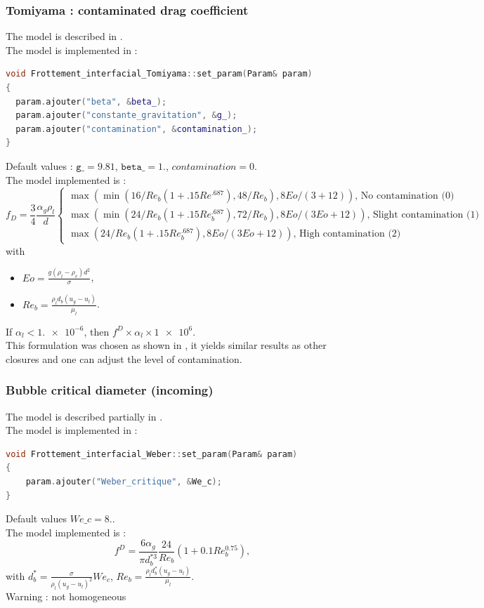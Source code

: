 \subsubsection{Tomiyama : contaminated drag coefficient}
The model is described in \cite{Tomiyama1998}.\\
The model is implemented in :
\begin{lstlisting}[language=c++]
void Frottement_interfacial_Tomiyama::set_param(Param& param)
{
  param.ajouter("beta", &beta_);
  param.ajouter("constante_gravitation", &g_);
  param.ajouter("contamination", &contamination_);
}
\end{lstlisting}
Default values : $\texttt{g\_}=9.81$, $\texttt{beta\_}=1.$, $contamination=0$.\\
The model implemented is :
\begin{equation}
f_D =\frac{3}{4}\frac{\alpha_g\rho_l}{d} \begin{cases} \max(\min(16/Re_b(1+.15Re^{.687}), 48/Re_b), 8Eo/(3+12)) \text{, No contamination (0)}\\
	\max(\min(24/Re_b(1+.15Re_b^{.687}), 72/Re_b), 8Eo/(3Eo+12)) \text{, Slight contamination (1)}\\
	\max(24/Re_b(1+.15Re_b^{.687}), 8Eo/(3Eo+12)) \text{, High contamination (2)} \end{cases}
\end{equation}
with
\begin{itemize}
    \item[\small \textcolor{blue}{\ding{109}}]$Eo = \frac{g(\rho_l-\rho_v)d^2}{\sigma}$,
    \item[\small \textcolor{blue}{\ding{109}}]$Re_b=\frac{\rho_l d_b (u_g-u_l)}{\mu_l}$.
\end{itemize}
If $\alpha_l < \num{1.e-6}$, then $f^D\times{}\alpha_l\times{}\num{1e6}$.\\
This formulation was chosen as shown in \cite{Sugrue2017}, it yields similar results as other closures and one can adjust the level of contamination.

\subsubsection{Bubble critical diameter (incoming)}
The model is described partially in \cite{KUO1988547}.\\
The model is implemented in :
\begin{lstlisting}[language=c++]
void Frottement_interfacial_Weber::set_param(Param& param)
{
    param.ajouter("Weber_critique", &We_c);
}
\end{lstlisting}
Default values $We\_ c=8.$.\\
The model implemented is :
\begin{equation}
   f^{D}=\frac{6\alpha_g}{\pi d_b^{*3}}\frac{24}{Re_b}(1+0.1Re_b^{0.75}),
\end{equation}
with $d_b^*= \frac{\sigma}{\rho_l(u_g-u_l)^2}We_c$, $Re_b=\frac{\rho_l d_b^* (u_g-u_l)}{\mu_l}$.\\
{\color{red} Warning} : not homogeneous

